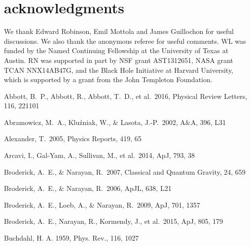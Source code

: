 \documentclass[useAMS,usenatbib]{mn2e}
\def\apj{{ ApJ}}
\def\apjl{{ ApJL}}
\def\aap{{ A\&A}}
\def\mnras{{ MNRAS}}
\def\nat {{ Nature}}
\def\physrep{{ Physics Reports}}
\begin{document}
\section{acknowledgments}
We thank Edward Robinson, Emil Mottola and James Guillochon for useful
discussions. We also thank the anonymous referee for useful comments.
WL was funded by the Named Continuing
Fellowship at the University of Texas at Austin.
RN was supported in part by NSF grant AST1312651, NASA
grant TCAN NNX14AB47G, and
the Black Hole Initiative at Harvard University, 
which is supported by a grant from the John Templeton Foundation.

\begin{thebibliography}{}

 Abbott, B.~P.,
  Abbott, R., Abbott, T.~D., et al.\ 2016, Physical Review Letters,
  116, 221101 

 Abramowicz,
  M.~A., Klu{\'z}niak, W., \& Lasota, J.-P.\ 2002, \aap, 396, L31 

 Alexander, T.\
  2005, \physrep, 419, 65

 Arcavi, I., Gal-Yam, A., 
Sullivan, M., et al.\ 2014, \apj, 793, 38 



 Broderick,
  A.~E., \& Narayan, R.\ 2007, Classical and Quantum Gravity, 24, 659 

 Broderick,
  A.~E., \& Narayan, R.\ 2006, \apjl, 638, L21 

 Broderick, A.~E., 
Loeb, A., \& Narayan, R.\ 2009, \apj, 701, 1357

 Broderick, A.~E., 
Narayan, R., Kormendy, J., et al.\ 2015, \apj, 805, 179

 Buchdahl, H. A. 1959, Phys. Rev.,
  116, 1027


\end{thebibliography}
\end{document}
